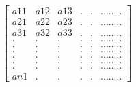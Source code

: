 \documentclass[preview]{standalone}
\begin{document}
\begin{align*}
\begin{bmatrix} {a}{11} & {a}{12} & {a}{13} & . & . & ........\\ {a}{21} & {a}{22} & {a}{23} & . & . & ........ \\ {a}{31} & {a}{32} & {a}{33} & . & . & ........
            \\ . & . & . & . & . & ........\\ . & . & . & . & . & ........\\ . & . & . & . & . & ........\\ . & . & . & . & . & ........
            \\ . & . & . & . & . & ........\\ . & . & . & . & . & ........\\ {a}{n1}   & . & . & . & . & ........\end{bmatrix}
\end{align*}
\end{document}
